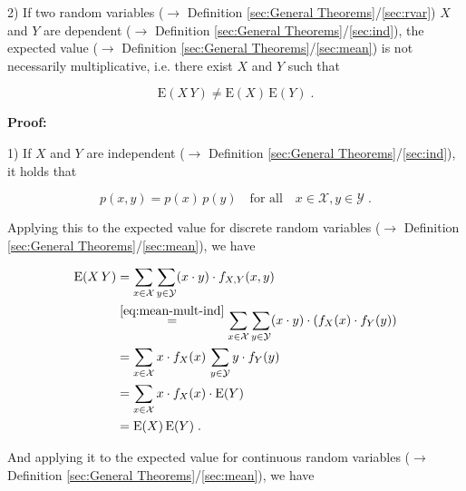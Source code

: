 \documentclass[a4paper,12pt,twoside]{book}
\begin{document}
2) If two random variables ($\rightarrow$ Definition \ref{sec:General Theorems}/\ref{sec:rvar}) $X$ and $Y$ are dependent ($\rightarrow$ Definition \ref{sec:General Theorems}/\ref{sec:ind}), the expected value ($\rightarrow$ Definition \ref{sec:General Theorems}/\ref{sec:mean}) is not necessarily multiplicative, i.e. there exist $X$ and $Y$ such that

\begin{equation} \label{eq:mean-mult-mean-nonmult}
\mathrm{E}(X\,Y) \neq \mathrm{E}(X) \, \mathrm{E}(Y) \; .
\end{equation}


\vspace{1em}
\textbf{Proof:}

1) If $X$ and $Y$ are independent ($\rightarrow$ Definition \ref{sec:General Theorems}/\ref{sec:ind}), it holds that

\begin{equation} \label{eq:mean-mult-ind}
p(x,y) = p(x) \, p(y) \quad \text{for all} \quad x \in \mathcal{X}, y \in \mathcal{Y} \; .
\end{equation}

Applying this to the expected value for discrete random variables ($\rightarrow$ Definition \ref{sec:General Theorems}/\ref{sec:mean}), we have

\begin{equation} \label{eq:mean-mult-mean-mult-disc}
\begin{split}
\mathrm{E}(X\,Y) &= \sum_{x \in \mathcal{X}} \sum_{y \in \mathcal{Y}} (x \cdot y) \cdot f_{X,Y}(x,y) \\
&\overset{\eqref{eq:mean-mult-ind}}{=} \sum_{x \in \mathcal{X}} \sum_{y \in \mathcal{Y}} (x \cdot y) \cdot \left( f_X(x) \cdot f_Y(y) \right) \\
&= \sum_{x \in \mathcal{X}} x \cdot f_X(x) \, \sum_{y \in \mathcal{Y}} y \cdot f_Y(y) \\
&= \sum_{x \in \mathcal{X}} x \cdot f_X(x) \cdot \mathrm{E}(Y) \\
&= \mathrm{E}(X) \, \mathrm{E}(Y) \; . \\
\end{split}
\end{equation}

And applying it to the expected value for continuous random variables ($\rightarrow$ Definition \ref{sec:General Theorems}/\ref{sec:mean}), we have
\end{document}
